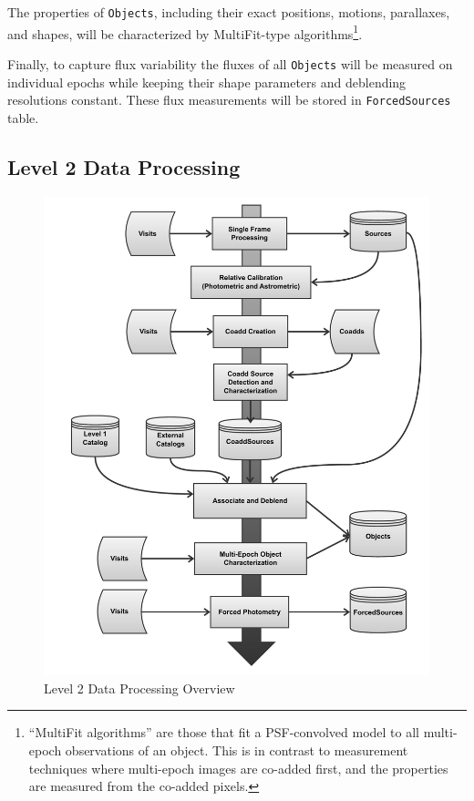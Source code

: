 \documentclass[12pt]{article}
\newcommand{\code}[1]{\texttt{#1}}
\newcommand{\Objects}{\code{Objects}\xspace}
\newcommand{\ForcedSources}{\code{ForcedSources}\xspace}
\begin{document}
The properties of \Objects, including their exact positions, motions, parallaxes, and shapes, will be characterized by MultiFit-type algorithms\footnote{``MultiFit algorithms'' are those that fit a PSF-convolved model to all multi-epoch observations of an object. This is in contrast to measurement techniques where multi-epoch images are co-added first, and the properties are measured from the co-added pixels.}.

Finally, to capture flux variability the fluxes of all \Objects will be measured on individual epochs while keeping their shape parameters and deblending resolutions constant. These flux measurements will be stored in \ForcedSources table.

\subsection{Level 2 Data Processing}
\label{sec:level2dp}

\begin{figure}[h]
    \centering
    \includegraphics[scale=0.5]{Level_2_Processing_Flowchart}
    \caption{Level 2 Data Processing Overview\label{fig:level2dp}}    
\end{figure}
\end{document}
